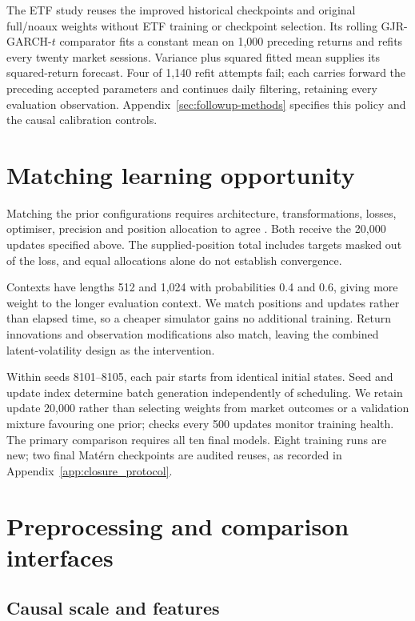 The ETF study reuses the improved historical checkpoints and original full/noaux weights without ETF training or checkpoint selection. Its rolling GJR-GARCH-$t$ comparator fits a constant mean on 1,000 preceding returns and refits every twenty market sessions. Variance plus squared fitted mean supplies its squared-return forecast. Four of 1,140 refit attempts fail; each carries forward the preceding accepted parameters and continues daily filtering, retaining every evaluation observation. Appendix~\ref{sec:followup-methods} specifies this policy and the causal calibration controls.

\section{Matching learning opportunity}

Matching the prior configurations requires architecture, transformations, losses, optimiser, precision and position allocation to agree \citep{dodge2019show}. Both receive the 20,000 updates specified above. The supplied-position total includes targets masked out of the loss, and equal allocations alone do not establish convergence.

Contexts have lengths 512 and 1,024 with probabilities 0.4 and 0.6, giving more weight to the longer evaluation context. We match positions and updates rather than elapsed time, so a cheaper simulator gains no additional training. Return innovations and observation modifications also match, leaving the combined latent-volatility design as the intervention.

Within seeds 8101--8105, each pair starts from identical initial states. Seed and update index determine batch generation independently of scheduling. We retain update 20,000 rather than selecting weights from market outcomes or a validation mixture favouring one prior; checks every 500 updates monitor training health. The primary comparison requires all ten final models. Eight training runs are new; two final Mat\'ern checkpoints are audited reuses, as recorded in Appendix~\ref{app:closure_protocol}.

\section{Preprocessing and comparison interfaces}

\subsection{Causal scale and features}

